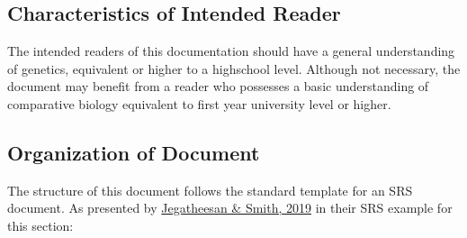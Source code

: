 \documentclass[12pt]{article}
\begin{document}

\subsection{Characteristics of Intended Reader} \label{sec_IntendedReader}

The intended readers of this documentation should have a general understanding of genetics, 
equivalent or higher to a highschool level. Although not necessary, the document may benefit
from a reader who possesses a basic understanding of comparative biology equivalent to first 
year university level or higher.  



\subsection{Organization of Document}

The structure of this document follows the standard template for an SRS document.
As presented by \href{https://jacquescarette.github.io/Drasil/examples/swhsnopcm/SRS/HTML/SWHSNoPCM_SRS.html}
{Jegatheesan \& Smith, 2019} in their SRS example for this section:
\end{document}
